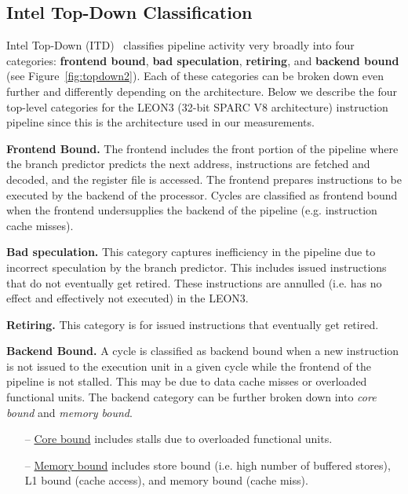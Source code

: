 \subsection{Intel Top-Down Classification}
\label{sec:topdown}

Intel Top-Down (ITD)~\cite{Yasin:2014:TDM} classifies pipeline activity very broadly into four categories: \textbf{frontend bound}, \textbf{bad speculation}, \textbf{retiring}, and \textbf{backend bound} (see Figure~\ref{fig:topdown2}). Each of these categories can be broken down even further and differently depending on the architecture. Below we describe the four top-level categories for the LEON3 (32-bit SPARC V8 architecture) instruction pipeline since this is the architecture used in our measurements.

\textbf{Frontend Bound.} The frontend includes the front portion of the pipeline where the branch predictor predicts the next address, instructions are fetched and decoded, and the register file is accessed. The frontend prepares instructions to be executed by the backend of the processor. Cycles are classified as frontend bound when the frontend undersupplies the backend of the pipeline (e.g. instruction cache misses).

\textbf{Bad speculation.} This category captures inefficiency in the pipeline due to incorrect speculation by the branch predictor. This includes issued instructions that do not eventually get retired. These instructions are annulled (i.e. has no effect and effectively not executed) in the LEON3.  

\textbf{Retiring.} This category is for issued instructions that eventually get retired. 

\textbf{Backend Bound.} A cycle is classified as backend bound when a new instruction is not issued to the execution unit in a given cycle while the frontend of the pipeline is not stalled. This may be due to data cache misses or overloaded functional units. The backend category can be further broken down into \emph{core bound} and \emph{memory bound}. 

\begin{itemize}
\item [--] \underline{Core bound} includes stalls due to overloaded functional units.
\item [--] \underline{Memory bound} includes store bound (i.e. high number of buffered stores), L1 bound (cache access), and memory bound (cache miss).
\end{itemize}

